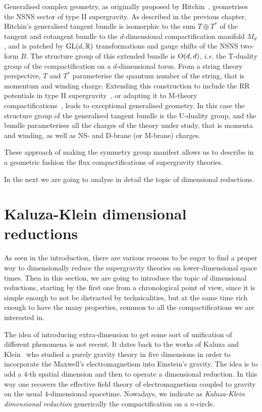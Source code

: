 \documentclass[debug]{phd}
\begin{document}
					Generalised complex geometry, as originally proposed by Hitchin~\cite{hitch1, gualtphd}, geometrises the NSNS sector of type II supergravity. 
					As described in the previous chapter, Hitchin's generalised tangent bundle is isomorphic to the sum $T \oplus T^*$ of the tangent and cotangent bundle to the $d$-dimensional compactification manifold $M_d$, and is patched by $\mathrm{GL}(d,\mathbb{R})$ transformations and gauge shifts of the NSNS two-form $B$. 
					The structure group of this extended bundle is $\mathrm{O}(d,d)$, \emph{i.e.} the T-duality group of the compactification on a $d$-dimensional torus.
					From a string theory perspective, $T$ and $T^*$ parameterise the quantum number of the string, that is momentum and winding charge.
					Extending this construction to include the RR potentials in type II supergravity~\cite{hull1, Grana:2009im, waldram4}, or adapting it to M-theory compactifications~\cite{hull1, waldram5, Coimbra:2011ky}, leads to exceptional generalised geometry. 
					In this case the structure group of the generalised tangent bundle is the U-duality group, and the bundle parameterises all the charges of the theory under study, that is momenta and winding, as well as NS- and D-brane (or M-brane) charges.
					
					These approach of making the symmetry group manifest allows us to describe in a geometric fashion the flux compactifications of supergravity theories.
					
					In the next we are going to analyse in detail the topic of dimensional reductions.
		\section{Kaluza-Klein dimensional reductions}
			As seen in the introduction, there are various reasons to be eager to find a proper way to dimensionally reduce the supergravity theories on lower-dimensional space times.
			Then in this section, we are going to introduce the topic of dimensional reductions, starting by the first one from a chronological point of view, since it is simple enough to not be distracted by technicalities, but at the same time rich enough to have the many properties, common to all the compactifications we are interested in.
			
			The idea of introducing extra-dimension to get some sort of unification of different phenomena is not recent.
			It dates back to the works of Kaluza and Klein~\cite{Kaluza, Klein} who studied a purely gravity theory in five dimensions in order to incorporate the Maxwell's electromagnetism into Einstein's gravity.
			The idea is to add a $4$-th spatial dimension and then to operate a dimensional reduction. In this way one recovers the effective field theory of electromagnetism coupled to gravity on the usual $4$-dimensional spacetime.
			Nowadays, we indicate as \emph{Kaluza-Klein dimensional reduction} generically the compactification on a $n$-circle.
			
\end{document}
